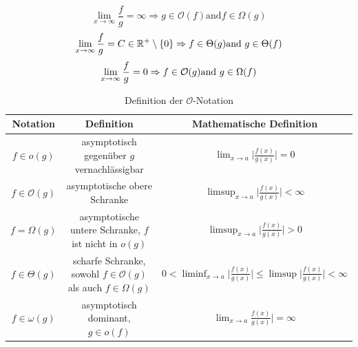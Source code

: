 \documentclass[a4paper]{article}
\begin{document}
    \begin{equation*}
    \lim_{x\to\infty}\frac fg = \infty \Rightarrow g \in \mathcal{O}(f) \text{and} f \in \Omega(g)
    \end{equation*}
    \begin{equation*}
    \lim_{x \rightarrow \infty} \frac fg = C \in \mathbb{R}^+ \setminus \left\lbrace 0 \right\rbrace \Rightarrow f \in\Theta(g)  \text{and } g \in\Theta(f) \\
    \end{equation*}
    \begin{equation*}
    \lim_{x \rightarrow \infty} \frac fg = 0 \Rightarrow f \in\mathcal{O}(g) \text{and } g \in\Omega(f) \\
    \end{equation*}


    \begin{table}
        \centering
        \small
        \begin{tabular}{c|c|c}
            Notation & Definition & Mathematische Definition \\
            \hline
            $f \in o(g)$ 
            & asymptotisch gegenüber $g$ vernachlässigbar 
            & $\lim_{x\to a} \big| \frac{f(x)}{g(x)} \big| = 0 $\\
            
             $f \in \mathcal{O}(g)$
             & asymptotische obere Schranke  
             & $\limsup_{x\to a} \big| \frac{f(x)}{g(x)} \big| < \infty $ \\
             
            $f = \Omega(g)$ 
            & asymptotische untere Schranke, $f$ ist nicht in $o(g)$ 
            & 
            $\limsup_{x\to a} \big| \frac{f(x)}{g(x)} \big| > 0 $\\

            $f \in \Theta(g)$            
            & scharfe Schranke,  sowohl $f \in \mathcal{O}(g)$ als auch $f \in \Omega(g)$
            &  $0 < \liminf_{x\to a} \big| \frac{f(x)}{g(x)} \big| \leq \limsup \big| \frac{f(x)}{g(x)} \big| < \infty $ \\

            $f \in \omega(g)$
            &  asymptotisch dominant, $g \in o(f)$
            & $\lim_{x \to a}\frac{f(x)}{g(x)} \big| = \infty$ \\
        \hline
        \end{tabular}
        \caption{Definition der $\mathcal{O}$-Notation}
        \label{tab:ONotation}
    \end{table}
    
\end{document}

